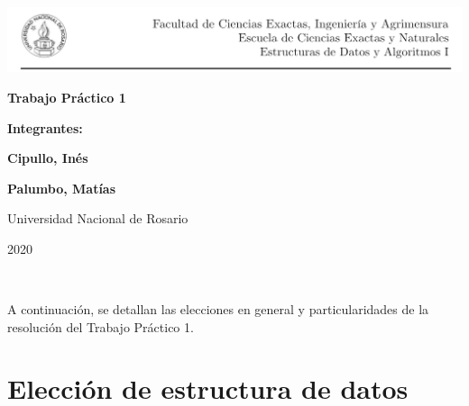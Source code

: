 \documentclass[11pt]{article}
\begin{document}
\begin{titlepage}
    \hspace{-1.2cm}\includegraphics[scale= 0.8]{header2}
    \begin{center}
        \vfill
        \vfill
            \vspace{0.7cm}
            \noindent\textbf{\Huge Trabajo Práctico 1}\par
            \vspace{.5cm}
        \vfill
        \noindent \textbf{\huge Integrantes:}\par
        \vspace{.5cm}
        \noindent \textbf{\Large Cipullo, Inés}\par
        \noindent \textbf{\Large Palumbo, Matías}\par
        
 
        \vfill
        \large Universidad Nacional de Rosario \par
        \noindent\large 2020
             
    \end{center}
 \end{titlepage}
 \ \par
\noindent A continuación, se detallan las elecciones en general y particularidades de la resolución del Trabajo Práctico 1.

\section{Elección de estructura de datos}
\end{document}
